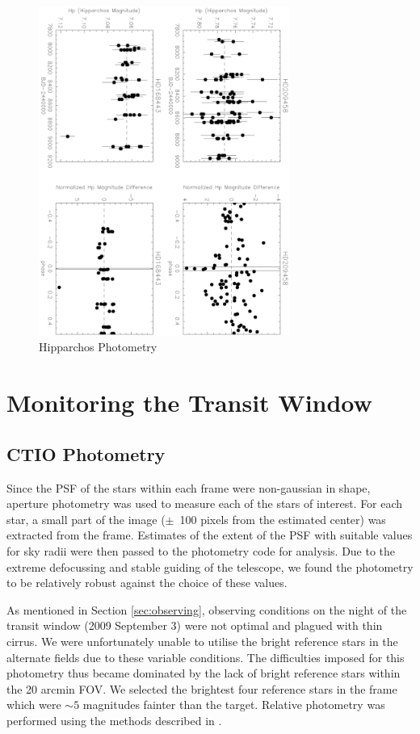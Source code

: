 \documentclass[12pt,preprint]{emulateapj}
\begin{document}
\begin{figure}[h]
  \includegraphics[angle=90,width=8.2cm]{HipparcosCheck}
  \caption{Hipparchos Photometry}
  \label{fig:hip}
\end{figure}



\section{Monitoring the Transit Window}
\subsection{CTIO Photometry}
\label{sec:photometry}

Since the PSF of the stars within each frame were non-gaussian in
shape, aperture photometry was used to measure each of the stars of
interest. For each star, a small part of the image ($\pm$~100 pixels
from the estimated center) was extracted from the frame. Estimates of
the extent of the PSF with suitable values for sky radii were then
passed to the photometry code for analysis. Due to the extreme
defocussing and stable guiding of the telescope, we found the
photometry to be relatively robust against the choice of these values.

As mentioned in Section \ref{sec:observing}, observing conditions on
the night of the transit window (2009 September 3) were not optimal
and plagued with thin cirrus. We were unfortunately unable to utilise
the bright reference stars in the alternate fields due to these
variable conditions. The difficulties imposed for this photometry thus
became dominated by the lack of bright reference stars within the 20
arcmin FOV. We selected the brightest four reference stars in the
frame which were $\sim 5$ magnitudes fainter than the target. Relative
photometry was performed using the methods described in \citet{eve01}.
\end{document}
